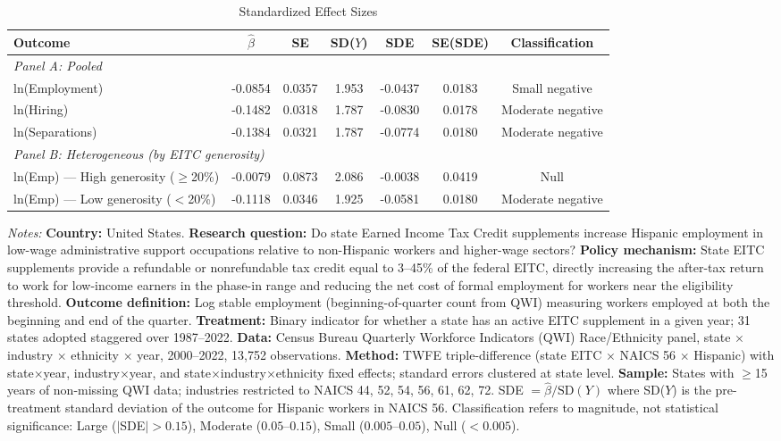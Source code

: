 \begin{table}[htbp]
\centering
\caption{Standardized Effect Sizes}
\label{tab:sde}
\footnotesize
\begin{adjustbox}{max width=\textwidth}
\begin{tabular}{lcccccc}
\hline\hline
Outcome & $\hat{\beta}$ & SE & SD($Y$) & SDE & SE(SDE) & Classification \\
\hline
\multicolumn{7}{l}{\textit{Panel A: Pooled}} \\
ln(Employment) & -0.0854 & 0.0357 & 1.953 & -0.0437 & 0.0183 & Small negative \\
ln(Hiring) & -0.1482 & 0.0318 & 1.787 & -0.0830 & 0.0178 & Moderate negative \\
ln(Separations) & -0.1384 & 0.0321 & 1.787 & -0.0774 & 0.0180 & Moderate negative \\
\hline
\multicolumn{7}{l}{\textit{Panel B: Heterogeneous (by EITC generosity)}} \\
ln(Emp) --- High generosity ($\geq$20\%) & -0.0079 & 0.0873 & 2.086 & -0.0038 & 0.0419 & Null \\
ln(Emp) --- Low generosity ($<$20\%) & -0.1118 & 0.0346 & 1.925 & -0.0581 & 0.0180 & Moderate negative \\
\hline\hline
\end{tabular}
\end{adjustbox}
\begin{tablenotes}[flushleft]
\small
\item \textit{Notes:} \textbf{Country:} United States. \textbf{Research question:} Do state Earned Income Tax Credit supplements increase Hispanic employment in low-wage administrative support occupations relative to non-Hispanic workers and higher-wage sectors? \textbf{Policy mechanism:} State EITC supplements provide a refundable or nonrefundable tax credit equal to 3--45\% of the federal EITC, directly increasing the after-tax return to work for low-income earners in the phase-in range and reducing the net cost of formal employment for workers near the eligibility threshold. \textbf{Outcome definition:} Log stable employment (beginning-of-quarter count from QWI) measuring workers employed at both the beginning and end of the quarter. \textbf{Treatment:} Binary indicator for whether a state has an active EITC supplement in a given year; 31 states adopted staggered over 1987--2022. \textbf{Data:} Census Bureau Quarterly Workforce Indicators (QWI) Race/Ethnicity panel, state $\times$ industry $\times$ ethnicity $\times$ year, 2000--2022, 13,752 observations. \textbf{Method:} TWFE triple-difference (state EITC $\times$ NAICS 56 $\times$ Hispanic) with state$\times$year, industry$\times$year, and state$\times$industry$\times$ethnicity fixed effects; standard errors clustered at state level. \textbf{Sample:} States with $\geq$15 years of non-missing QWI data; industries restricted to NAICS 44, 52, 54, 56, 61, 62, 72. SDE $= \hat{\beta} / \text{SD}(Y)$ where SD($Y$) is the pre-treatment standard deviation of the outcome for Hispanic workers in NAICS 56. Classification refers to magnitude, not statistical significance: Large ($|$SDE$| > 0.15$), Moderate ($0.05$--$0.15$), Small ($0.005$--$0.05$), Null ($< 0.005$). 
\end{tablenotes}
\end{table}
